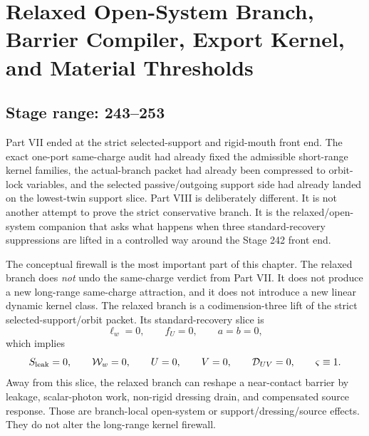\chapter[Relaxed Branch, Export Kernel, and Material Thresholds]{Relaxed Open-System Branch, Barrier Compiler, Export Kernel, and Material Thresholds}
\label{chap:part08_relaxed_branch}

\section*{Stage range: 243--253}

Part VII ended at the strict selected-support and rigid-mouth front end.  The exact one-port same-charge audit had already fixed the admissible short-range kernel families, the actual-branch packet had already been compressed to orbit-lock variables, and the selected passive/outgoing support side had already landed on the lowest-twin support slice.  Part VIII is deliberately different.  It is not another attempt to prove the strict conservative branch.  It is the relaxed/open-system companion that asks what happens when three standard-recovery suppressions are lifted in a controlled way around the Stage 242 front end.

The conceptual firewall is the most important part of this chapter.  The relaxed branch does \emph{not} undo the same-charge verdict from Part VII.  It does not produce a new long-range same-charge attraction, and it does not introduce a new linear dynamic kernel class.  The relaxed branch is a codimension-three lift of the strict selected-support/orbit packet.  Its standard-recovery slice is
\begin{equation}
\label{eq:part08-intro-recovery-slice}
\ell_w=0,
\qquad
f_U=0,
\qquad
a=b=0,
\end{equation}
which implies
\begin{equation}
\label{eq:part08-intro-recovery-observables}
S_{\rm leak}=0,
\qquad
\mathcal W_w=0,
\qquad
U=0,
\qquad
V=0,
\qquad
\mathcal D_{UV}=0,
\qquad
\varsigma\equiv 1.
\end{equation}
Away from this slice, the relaxed branch can reshape a near-contact barrier by leakage, scalar-photon work, non-rigid dressing drain, and compensated source response.  Those are branch-local open-system or support/dressing/source effects.  They do not alter the long-range kernel firewall.

